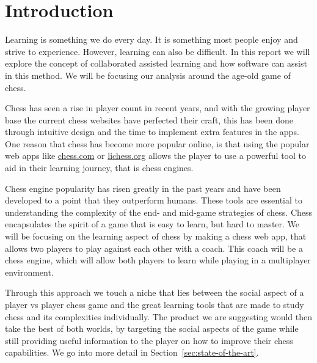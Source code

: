 \chapter{Introduction}\label{ch:introduction}

Learning is something we do every day.
It is something most people enjoy and strive to experience.
However, learning can also be difficult.
In this report we will explore the concept of collaborated assisted learning and how software can assist in this method.
We will be focusing our analysis around the age-old game of chess.

Chess has seen a rise in player count in recent years, and with the growing player base the current chess websites have
perfected their craft, this has been done through intuitive design and the time to implement extra features in the apps.
One reason that chess has become more popular online, is that using the popular web apps like \url{chess.com} or
\url{lichess.org} allows the player to use a powerful tool to aid in their learning journey, that is chess engines.

Chess engine popularity has risen greatly in the past years and have been developed to a point that they
outperform humans.
These tools are essential to understanding the complexity of the end- and mid-game strategies of chess.
Chess encapsulates the spirit of a game that is easy to learn, but hard to master.
We will be focusing on the learning aspect of chess by making a chess web app, that allows two players to play against
each other with a coach.
This coach will be a chess engine, which will allow both players to learn while playing in a multiplayer environment.

Through this approach we touch a niche that lies between the social aspect of a player vs player chess game and the
great learning tools that are made to study chess and its complexities individually.
The product we are suggesting would then take the best of both worlds, by targeting the social aspects of the game while
still providing useful information to the player on how to improve their chess capabilities.
We go into more detail in Section~\ref{sec:state-of-the-art}.
